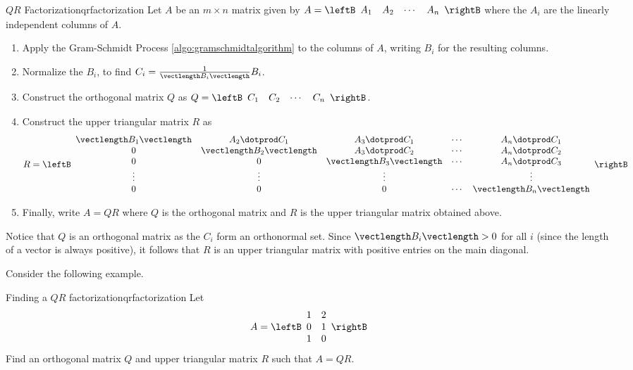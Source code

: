 \begin{procedure}{$QR$ Factorization}{qrfactorization}
Let $A$ be an $m \times n$ matrix given by $A = \leftB 
\begin{array}{cccc}
A_1 & A_2 & \cdots & A_n 
\end{array}
\rightB$ where the $A_i$ are the linearly independent columns of $A$. 
\begin{enumerate}
\item
Apply the Gram-Schmidt Process \ref{algo:gramschmidtalgorithm} to the columns of $A$, writing $B_i$ for the resulting columns.

\item
Normalize the $B_i$, to find $C_i = \frac{1}{\vectlength B_i \vectlength} B_i$. 

\item
Construct the orthogonal matrix $Q$ as $Q=\leftB 
\begin{array}{cccc}
C_1 & C_2 & \cdots & C_n 
\end{array}
\rightB$. 

\item 
Construct the upper triangular matrix $R$ as 
\[ R = 
\leftB
\begin{array}{ccccc}
\vectlength B_1 \vectlength & A_2 \dotprod C_1 & A_3 \dotprod C_1 & \cdots & A_n \dotprod C_1 \\
0 & \vectlength B_2 \vectlength & A_3 \dotprod C_2 & \cdots & A_n \dotprod C_2 \\
0 & 0 & \vectlength B_3 \vectlength & \cdots & A_n \dotprod C_3 \\
\vdots & \vdots & \vdots & & \vdots \\
0 & 0 & 0 & \cdots & \vectlength B_n \vectlength 
\end{array}
\rightB
\]

\item
Finally, write $A=QR$ where $Q$ is the orthogonal matrix and $R$ is the upper triangular matrix obtained above. 
\end{enumerate} 
\end{procedure}

Notice that $Q$ is an orthogonal matrix as the $C_i$ form an orthonormal set. Since $\vectlength B_i \vectlength > 0$ for all $i$ (since the length of a vector is always positive), it follows that $R$ is an upper triangular matrix with positive entries on the main diagonal. 

Consider the following example.

\begin{example}{Finding a $QR$ factorization}{qrfactorization}
Let \[
A = \leftB \begin{array}{rr}
1 & 2 \\
0 & 1 \\
1 & 0 
\end{array} \rightB
\]
Find an orthogonal matrix $Q$ and upper triangular matrix $R$ such that $A=QR$. 
\end{example}

